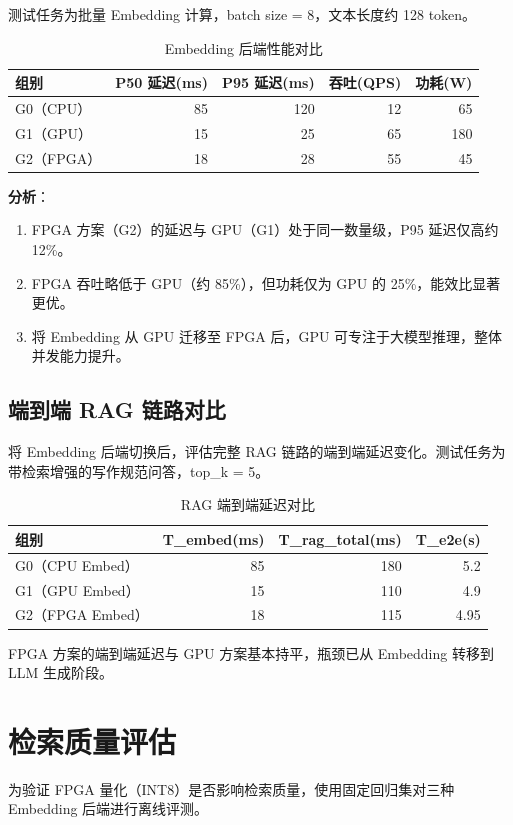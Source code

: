 测试任务为批量 Embedding 计算，batch size = 8，文本长度约 128 token。

\begin{table}[htbp]
  \centering
  \caption{Embedding 后端性能对比}
  \label{tab:embed-perf}
  \begin{tabular}{lrrrr}
    \toprule
    组别 & P50 延迟(ms) & P95 延迟(ms) & 吞吐(QPS) & 功耗(W) \\
    \midrule
    G0（CPU） & 85 & 120 & 12 & 65 \\
    G1（GPU） & 15 & 25 & 65 & 180 \\
    G2（FPGA） & 18 & 28 & 55 & 45 \\
    \bottomrule
  \end{tabular}
\end{table}

\textbf{分析}：
\begin{enumerate}[label=(\arabic*)]
  \item FPGA 方案（G2）的延迟与 GPU（G1）处于同一数量级，P95 延迟仅高约 12\%。
  \item FPGA 吞吐略低于 GPU（约 85\%），但功耗仅为 GPU 的 25\%，能效比显著更优。
  \item 将 Embedding 从 GPU 迁移至 FPGA 后，GPU 可专注于大模型推理，整体并发能力提升。
\end{enumerate}

\subsection{端到端 RAG 链路对比}
将 Embedding 后端切换后，评估完整 RAG 链路的端到端延迟变化。测试任务为带检索增强的写作规范问答，top\_k = 5。

\begin{table}[htbp]
  \centering
  \caption{RAG 端到端延迟对比}
  \label{tab:rag-e2e}
  \begin{tabular}{lrrr}
    \toprule
    组别 & T\_embed(ms) & T\_rag\_total(ms) & T\_e2e(s) \\
    \midrule
    G0（CPU Embed） & 85 & 180 & 5.2 \\
    G1（GPU Embed） & 15 & 110 & 4.9 \\
    G2（FPGA Embed） & 18 & 115 & 4.95 \\
    \bottomrule
  \end{tabular}
\end{table}

FPGA 方案的端到端延迟与 GPU 方案基本持平，瓶颈已从 Embedding 转移到 LLM 生成阶段。

\section{检索质量评估}
为验证 FPGA 量化（INT8）是否影响检索质量，使用固定回归集对三种 Embedding 后端进行离线评测。

